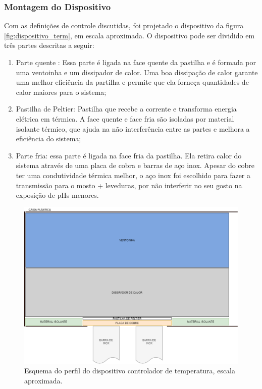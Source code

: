 \subsubsection*{Montagem do Dispositivo}

Com as definições de controle discutidas, foi projetado o dispositivo da figura \ref{fig:dispositivo_term}, em escala aproximada. O dispositivo pode ser dividido em três partes descritas a seguir:

\begin{enumerate}
    \item Parte quente : Essa parte é ligada na face quente da pastilha e é formada por uma ventoinha e um dissipador de calor. Uma boa dissipação de calor garante uma melhor eficiência da partilha e permite que ela forneça quantidades de calor maiores para o sistema;
    \item Pastilha de Peltier: Pastilha que recebe a corrente e transforma energia elétrica em térmica. A face quente e face fria são isoladas por material isolante térmico, que ajuda na não interferência entre as partes e melhora a eficiência do sistema;
    \item Parte fria: essa parte é ligada na face fria da pastilha. Ela retira calor do sistema através de uma placa de cobra e barras de aço inox. Apesar do cobre ter uma condutividade térmica melhor, o aço inox foi escolhido para fazer a transmissão para o mosto + leveduras, por não interferir no seu gosto na exposição de pHs menores. 
\end{enumerate}


\begin{figure}[h]
    \centering
    \includegraphics[scale=0.45]{figuras/implementacao/hardware/montagem.png}
    \caption{Esquema do perfil do dispositivo controlador de temperatura, escala aproximada.}
    \label{fig:pwm}
\end{figure}

